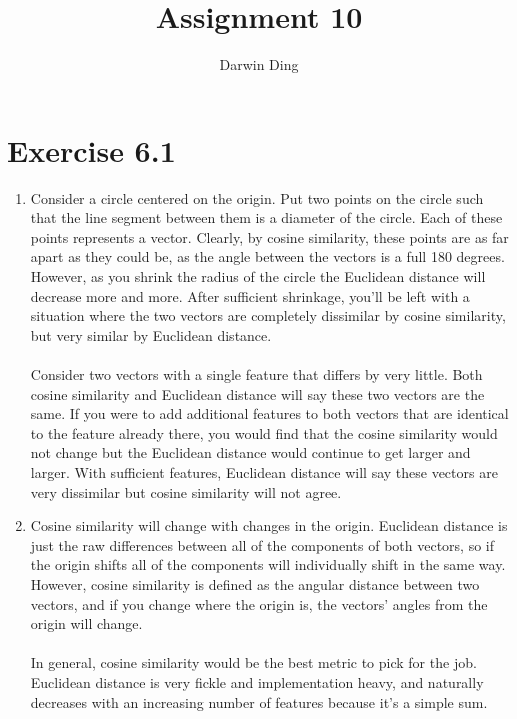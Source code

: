 \documentclass[12pt]{article}
\begin{document}
\title{Assignment 10}
\author{Darwin Ding}
\maketitle

\section*{Exercise 6.1}
\begin{enumerate}[label=(\alph*)]
	\item Consider a circle centered on the origin. Put two points on the circle such that the line segment between them is a diameter of the circle. Each of these points represents a vector. Clearly, by cosine similarity, these points are as far apart as they could be, as the angle between the vectors is a full 180 degrees. However, as you shrink the radius of the circle the Euclidean distance will decrease more and more. After sufficient shrinkage, you'll be left with a situation where the two vectors are completely dissimilar by cosine similarity, but very similar by Euclidean distance.
	\\ \\ Consider two vectors with a single feature that differs by very little. Both cosine similarity and Euclidean distance will say these two vectors are the same. If you were to add additional features to both vectors that are identical to the feature already there, you would find that the cosine similarity would not change but the Euclidean distance would continue to get larger and larger. With sufficient features, Euclidean distance will say these vectors are very dissimilar but cosine similarity will not agree.
	\item Cosine similarity will change with changes in the origin. Euclidean distance is just the raw differences between all of the components of both vectors, so if the origin shifts all of the components will individually shift in the same way. However, cosine similarity is defined as the angular distance between two vectors, and if you change where the origin is, the vectors' angles from the origin will change.
	\\ \\ In general, cosine similarity would be the best metric to pick for the job. Euclidean distance is very fickle and implementation heavy, and naturally decreases with an increasing number of features because it's a simple sum.
\end{enumerate}
\end{document}
